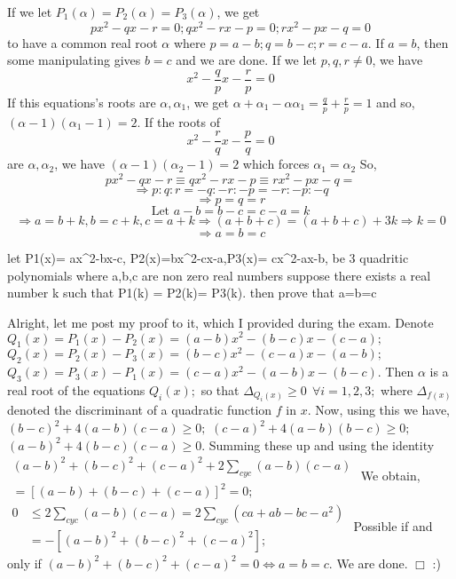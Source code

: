 \begin{solution}
	If we let $P_1(\alpha)=P_2(\alpha)=P_3(\alpha)$, we get
\[px^2-qx-r=0; qx^2-rx-p=0; rx^2-px-q=0\]
to have a common real root $\alpha$ where $p=a-b; q=b-c; r=c-a$.
If $a=b$, then some manipulating gives $b=c$ and we are done.
If we let $p, q, r\neq 0$, we have
\[x^2-\frac{q}{p}x-\frac{r}{p}=0\]
If this equations's roots are $\alpha, \alpha_1$, we get $\alpha+\alpha_1-\alpha\alpha_1=\frac{q}{p}+\frac{r}{p}=1$ and so, $(\alpha-1)(\alpha_1-1)=2$.
If the roots of
\[x^2-\frac{r}{q}x-\frac{p}{q}=0\]
are $\alpha, \alpha_2$, we have $(\alpha-1)(\alpha_2-1)=2$ which forces $\alpha_1=\alpha_2$
So, 
\[px^2-qx-r\equiv qx^2-rx-p\equiv rx^2-px-q=\]
\[\Longrightarrow p:q:r=-q:-r:-p=-r:-p:-q\]
\[\Longrightarrow p=q=r\]
\[\text{Let  }a-b=b-c=c-a=k\]
\[\Longrightarrow a=b+k, b=c+k, c=a+k\Longrightarrow (a+b+c)=(a+b+c)+3k\Longrightarrow k=0\]
\[\Longrightarrow a=b=c\]
\end{solution}



\begin{solution}
	\begin{tcolorbox}let P1(x)= ax^2-bx-c, P2(x)=bx^2-cx-a,P3(x)= cx^2-ax-b, be 3 quadritic polynomials  where a,b,c are non zero real numbers suppose there exists a real number k such that  P1(k) = P2(k)= P3(k). then prove that a=b=c\end{tcolorbox}
Alright, let me post my proof to it, which I provided during the exam.
Denote
$Q_1(x)=P_1(x)-P_2(x)=(a-b)x^2-(b-c)x-(c-a);$
$Q_2(x)=P_2(x)-P_3(x)=(b-c)x^2-(c-a)x-(a-b);$
$Q_3(x)=P_3(x)-P_1(x)=(c-a)x^2-(a-b)x-(b-c).$
Then $\alpha$ is a real root of the equations $Q_i(x);$ so that $\Delta_{Q_i(x)}\geq 0 \ \ \forall i=1,2,3;$ where $\Delta_{f(x)}$ denoted the discriminant of a quadratic function $f$ in $x.$
Now, using this we have,
$(b-c)^2+4(a-b)(c-a)\geq 0;$
$(c-a)^2+4(a-b)(b-c)\geq 0;$
$(a-b)^2+4(b-c)(c-a)\geq 0.$
Summing these up and using the identity
$\begin{aligned}(a-b)^2+(b-c)^2+(c-a)^2+2\sum_{cyc}(a-b)(c-a)\\=[(a-b)+(b-c)+(c-a)]^2=0;\end{aligned}$
We obtain,
$\begin{aligned}0&\leq 2\sum_{cyc}(a-b)(c-a)=2\sum_{cyc}(ca+ab-bc-a^2)\\&=-\left[(a-b)^2+(b-c)^2+(c-a)^2\right];\end{aligned}$
Possible if and only if $(a-b)^2+(b-c)^2+(c-a)^2=0\iff a=b=c.$ We are done. $\Box$
:)
\end{solution}



